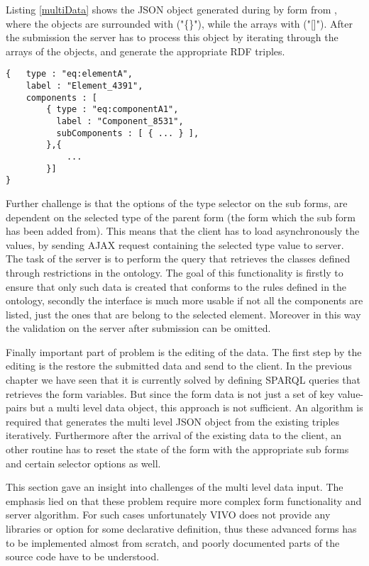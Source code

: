 Listing \ref{multiData} shows the JSON object generated during by form from , where the objects are surrounded with ("\{\}"), while the arrays with ("[]"). After the submission the server has to process this object by iterating through the arrays of the objects, and generate the appropriate RDF triples.


\begin{lstlisting}[basicstyle=\footnotesize, frame=single, caption={Multi level form data in JSON}, label=multiData, captionpos=b, belowskip=1em, aboveskip=2em]
{	type : "eq:elementA",
	label : "Element_4391",
	components : [
		{ type : "eq:componentA1",
		  label : "Component_8531",	
		  subComponents : [ { ... } ],
		},{ 
			... 
		}]
}
\end{lstlisting}


Further challenge is that the options of the type selector on the sub forms, are dependent on the selected type of the parent form (the form which the sub form has been added from). This means that the client has to load asynchronously the values, by sending AJAX request containing the selected type value to server. The task of the server is to perform the query that retrieves the classes defined through restrictions in the ontology. The goal of this functionality is firstly to ensure that only such data is created that conforms to the rules defined in the ontology, secondly the interface is much more usable if not all the components are listed, just the ones that are belong to the selected element. Moreover in this way the validation on the server after submission can be omitted.

Finally important part of problem is the editing of the data. The first step by the editing is the restore the submitted data and send to the client. In the previous chapter we have seen that it is currently solved by defining  SPARQL queries that retrieves the form variables. But since the form data is not just a set of key value-pairs but a multi level data object, this approach is not sufficient. An algorithm is required that generates the multi level JSON object from the existing triples iteratively. Furthermore after the arrival of the existing data to the client, an other routine has to reset the state of the form with the appropriate sub forms and certain selector options as well.


This section gave an insight into challenges of the multi level data input. The emphasis lied on that these problem require more complex form functionality and server algorithm. For such cases unfortunately VIVO does not provide any libraries or option for some declarative definition, thus these advanced forms has to be implemented almost from scratch, and poorly documented parts of the source code have to be understood.

